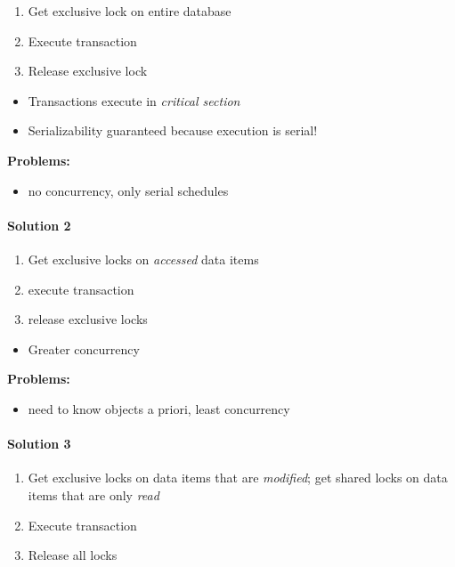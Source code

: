 \begin{enumerate}
\item Get exclusive lock on entire database
\item Execute transaction
\item Release exclusive lock
\end{enumerate}

\begin{itemize}
\item Transactions execute in \textit{critical section}
\item Serializability guaranteed because execution is serial!
\end{itemize}

\textbf{{\color{red} Problems:}}
\begin{itemize}
\item no concurrency, only serial schedules
\end{itemize}

\paragraph{Solution 2}
\begin{enumerate}
\item Get exclusive locks on \textit{accessed} data items
\item execute transaction
\item release exclusive locks
\end{enumerate}

\begin{itemize}
\item Greater concurrency
\end{itemize}

\textbf{{\color{red} Problems:}}
\begin{itemize}
\item need to know objects a priori, least concurrency
\end{itemize}

\paragraph{Solution 3}
\begin{enumerate}
\item Get exclusive locks on data items that are
  \textit{modified}; get shared locks on data items that
  are only \textit{read}
\item Execute transaction
\item Release all locks
\end{enumerate}


